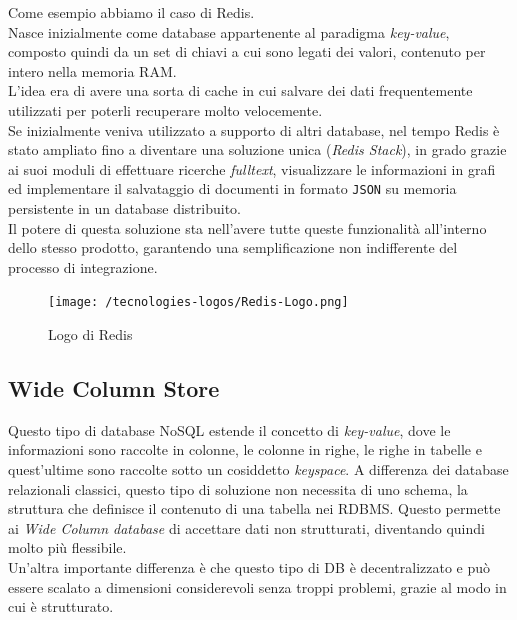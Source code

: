 \noindent Come esempio abbiamo il caso di Redis.\\
Nasce inizialmente come database appartenente al paradigma \textit{key-value}, composto quindi da un set di chiavi a cui sono legati dei valori, contenuto per intero nella memoria RAM.\\
L'idea era di avere una sorta di cache in cui salvare dei dati frequentemente utilizzati per poterli recuperare molto velocemente.\\
Se inizialmente veniva utilizzato a supporto di altri database, nel tempo Redis è stato ampliato fino a diventare una soluzione unica (\textit{Redis Stack}), in grado grazie ai suoi moduli di effettuare ricerche \textit{fulltext}, visualizzare le informazioni in grafi ed implementare il salvataggio di documenti in formato \texttt{JSON} su memoria persistente in un \gls{database distribuito}.\\
Il potere di questa soluzione sta nell'avere tutte queste funzionalità all'interno dello stesso prodotto, garantendo una semplificazione non indifferente del processo di integrazione.

\begin{figure}[htbp]
\begin{center}
\texttt{[image: /tecnologies-logos/Redis-Logo.png]}
\caption{Logo di Redis}
\end{center}
\end{figure}

\subsection{Wide Column Store}
Questo tipo di database NoSQL estende il concetto di \textit{key-value}, dove le informazioni sono raccolte in colonne, le colonne in righe, le righe in tabelle e quest'ultime sono raccolte sotto un cosiddetto \textit{keyspace}. A differenza dei database relazionali classici, questo tipo di soluzione non necessita di uno schema, la struttura che definisce il contenuto di una tabella nei RDBMS. Questo permette ai \textit{Wide Column database} di accettare dati non strutturati, diventando quindi molto più flessibile.\\
Un'altra importante differenza è che questo tipo di DB è decentralizzato e può essere scalato a dimensioni considerevoli senza troppi problemi, grazie al modo in cui è strutturato.\\

